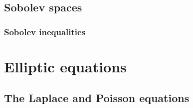 \documentclass{../note}
\begin{document}
\chapter{Sobolev spaces}




\section{Sobolev inequalities}







\part{Elliptic equations}
\chapter{The Laplace and Poisson equations}
\end{document}
